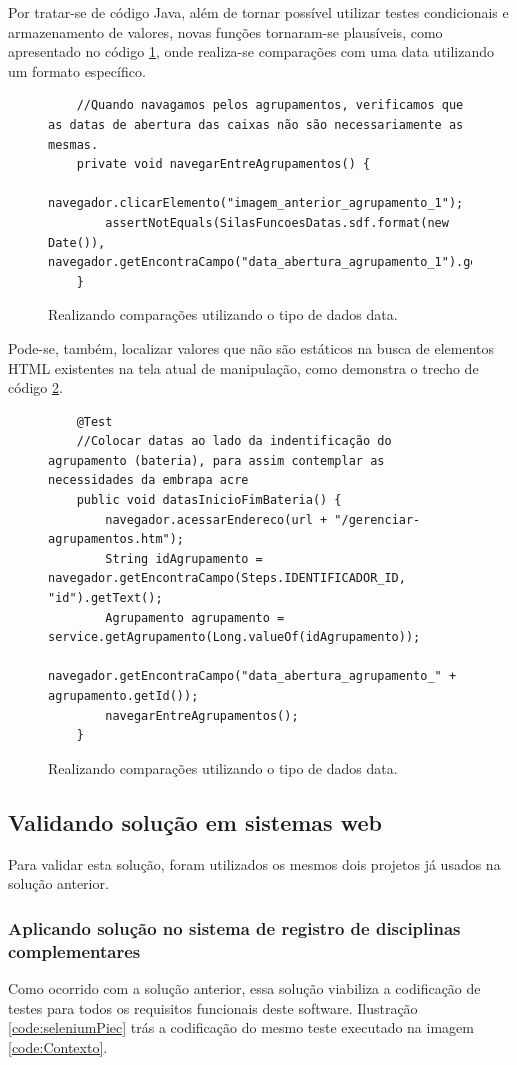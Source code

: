 \documentclass[tg]{mdtufsm}
\begin{document}
Por tratar-se de código Java, além de tornar possível utilizar testes condicionais e armazenamento de valores, novas funções tornaram-se plausíveis, como apresentado no código \ref{code:seleniumDate}, onde realiza-se comparações com uma data utilizando um formato específico.

\begin{figure}[!htt]
	\begin{lstlisting}
	//Quando navagamos pelos agrupamentos, verificamos que as datas de abertura das caixas não são necessariamente as mesmas.
	private void navegarEntreAgrupamentos() {
		navegador.clicarElemento("imagem_anterior_agrupamento_1");
		assertNotEquals(SilasFuncoesDatas.sdf.format(new Date()), navegador.getEncontraCampo("data_abertura_agrupamento_1").getText());
	}
	\end{lstlisting}
	\caption{Realizando comparações utilizando o tipo de dados data.}
	\label{code:seleniumDate}
\end{figure}

Pode-se, também, localizar valores que não são estáticos na busca de elementos HTML existentes na tela atual de manipulação, como demonstra o trecho de código \ref{code:seleniumBuscaId}.

\begin{figure}[!htt]
	\begin{lstlisting}
	@Test
	//Colocar datas ao lado da indentificação do agrupamento (bateria), para assim contemplar as necessidades da embrapa acre
	public void datasInicioFimBateria() {
		navegador.acessarEndereco(url + "/gerenciar-agrupamentos.htm");
		String idAgrupamento = navegador.getEncontraCampo(Steps.IDENTIFICADOR_ID, "id").getText();
		Agrupamento agrupamento = service.getAgrupamento(Long.valueOf(idAgrupamento));
		navegador.getEncontraCampo("data_abertura_agrupamento_" + agrupamento.getId());
		navegarEntreAgrupamentos();
	}	
	\end{lstlisting}
	\caption{Realizando comparações utilizando o tipo de dados data.}
	\label{code:seleniumBuscaId}
\end{figure}


\subsection{Validando solução em sistemas web}
Para validar esta solução, foram utilizados os mesmos dois projetos já usados na solução anterior.

\subsubsection{Aplicando solução no sistema de registro de disciplinas complementares}
Como ocorrido com a solução anterior, essa solução viabiliza a codificação de testes para todos os requisitos funcionais deste software. Ilustração \ref{code:seleniumPiec} trás a codificação do mesmo teste executado na imagem \ref{code:Contexto}.
\end{document}

